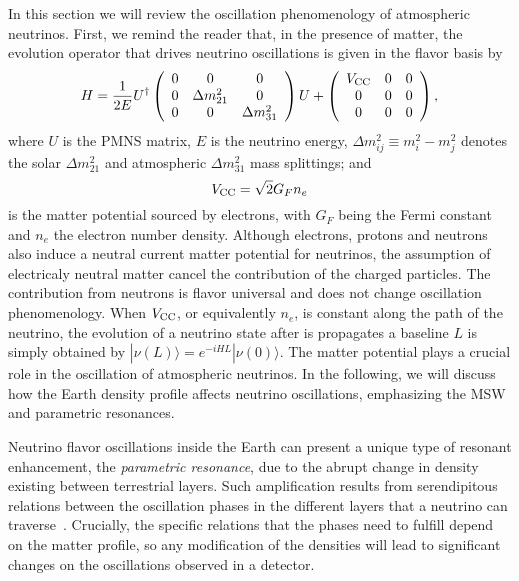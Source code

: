 In this section we will review the oscillation phenomenology of atmospheric neutrinos. 
First, we remind the reader that, in the presence of matter, the evolution operator that drives neutrino oscillations is given in the flavor basis by
\begin{equation}\label{eq:hamiltonian}
  H = \frac{1}{2E}
U^\dagger\left(
\begin{array}{ccc}
 0 & 0  & 0  \\
 0 & \Delta m^2_{21}  &  0  \\
 0 & 0  &  \Delta m^2_{31} 
\end{array}
\right)U
+
\left(
\begin{array}{ccc}
 V_{\rm CC} & 0  & 0  \\
 0 & 0  &  0  \\
 0 & 0  &  0 
\end{array}
\right),
\end{equation}
where $U$ is the PMNS matrix, $E$ is the neutrino energy, $\Delta m^2_{ij}\equiv m_i^2-m_j^2$ denotes the solar $\Delta m^2_{21}$ and atmospheric $\Delta m^2_{31}$ mass splittings; and 
\begin{equation}
  V_{\rm CC} = \sqrt{2} G_F n_e
\end{equation}
is the matter potential sourced by electrons, with $G_F$ being the Fermi constant and $n_e$ the electron number density. 
Although electrons, protons and neutrons also induce a neutral current matter potential for neutrinos, the assumption of electricaly neutral matter cancel the contribution of the charged particles. The contribution from neutrons is flavor universal and does not change oscillation phenomenology.
When $V_{\rm CC}$, or equivalently $n_e$, is constant along the path of the neutrino, the evolution of a neutrino state after is propagates a baseline $L$ is simply obtained by $|\nu(L)\rangle = e^{-iHL} |\nu(0)\rangle$. 
The matter potential plays a crucial role in the oscillation of atmospheric neutrinos.
In the following, we will discuss how the Earth density profile affects neutrino oscillations, emphasizing the MSW and parametric resonances.

Neutrino flavor oscillations inside the Earth can present a unique type of resonant enhancement, the \emph{parametric resonance}, due to the abrupt change in density existing between terrestrial layers.
Such amplification results from serendipitous relations between the oscillation phases in the different layers that a neutrino can traverse~\cite{Akhmedov:1998ui,Akhmedov:1998xq,Chizhov:1998ug,Chizhov:1999az,Chizhov:1999he,Liu:1998nb}.
Crucially, the specific relations that the phases need to fulfill depend on the matter profile, so any modification of the densities will lead to significant changes on the oscillations observed in a detector. 

